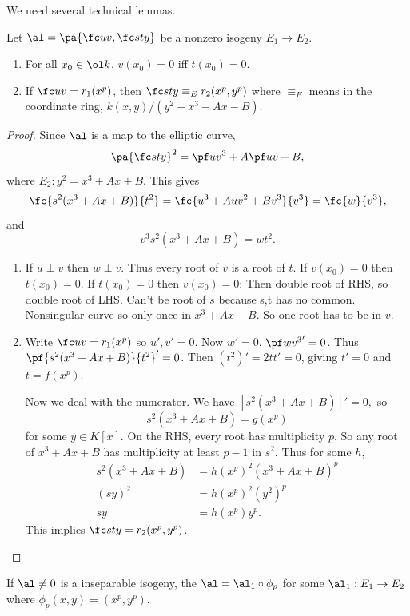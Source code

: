 
We need several technical lemmas.
\begin{lem}
Let $\al=\pa{\fc uv,\fc st y}$ be a nonzero isogeny $E_1\to E_2$.
\begin{enumerate}
\item For all $x_0\in \ol k$, $v(x_0)=0$ iff $t(x_0)=0$.
\item If $\fc uv=r_1(x^p)$, then $\fc sty\equiv_E r_2(x^p,y^p)$ where $\equiv_E$ means in the coordinate ring, $k(x,y)/(y^2-x^3-Ax-B)$.
\end{enumerate}
\end{lem}
\begin{proof}
Since $\al$ is a map to the elliptic curve,
\[
\pa{\fc st y}^2 =\pf uv^3+A\pf uv +B,
\]
where $E_2:y^2=x^3+Ax+B$. This gives
\[
\fc{s^2(x^3+Ax+B)}{t^2}=\fc{u^3+Auv^2+Bv^3}{v^3} =\fc{w}{v^3},
\]
and
\[
v^3s^2(x^3+Ax+B)=wt^2.
\]
\begin{enumerate}
\item
If $u\perp v$ then $w\perp v$. Thus every root of $v$ is a root of $t$. If $v(x_0)=0$ then $t(x_0)=0$. If $t(x_0)=0$ then $v(x_0)=0$: Then double root of RHS, so double root  of LHS. Can't be root of $s$ because s,t has no common. Nonsingular curve so only once in $x^3+Ax+B$. So one root has to be in $v$.
\item Write $\fc uv=r_1(x^p)$ so $u',v'=0$. Now $w'=0$, $\pf w{v^3}'=0$. Thus $\pf{s^2(x^3+Ax+B)}{t^2}'=0$. Then $(t^2)'=2tt'=0$, giving $t'=0$ and $t=f(x^p)$. %

Now we deal with the numerator. We have
$
[s^2(x^3+Ax+B)]'=0,
$
so 
\[
s^2(x^3+Ax+B)=g(x^p)
\]
for some $y\in K[x]$.
On the RHS, every root has multiplicity $p$. So any root of $x^3+Ax+B$ has multiplicity at least $p-1$ in $s^2$. Thus for some $h$,
\begin{align*}
s^2(x^3+Ax+B)&=h(x^p)^2(x^3+Ax+B)^p\\
(sy)^2&=h(x^p)^2(y^2)^p\\
sy&=h(x^p)y^p.
\end{align*}
This implies $\fc st y=r_2(x^p,y^p)$.
\end{enumerate}
\end{proof}
\begin{cor}
If $\al\ne 0$ is a inseparable isogeny, the $\al=\al_1\circ \phi_p$ for some $\al_1:E_1\to E_2$ where $\phi_p(x,y)=(x^p,y^p)$.
\end{cor}
